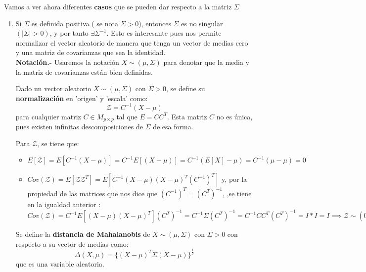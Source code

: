 Vamos a ver ahora diferentes \textbf{casos} que se pueden dar respecto a la matriz $\Sigma$
\begin{enumerate}
\item Si $\Sigma$ es definida positiva ( se nota $\Sigma > 0$), entonces $\Sigma$ es no singular $(|\Sigma| > 0)$, y por tanto $\exists \Sigma^{-1}$. Esto es interesante pues nos permite normalizar el vector aleatorio de manera que tenga un vector de medias cero y una matriz de covarianzas que sea la identidad.\\

  \textbf{Notación.-} Usaremos la notación $X\sim(\mu,\Sigma)$ para denotar que la media y la matriz de covarianzas están bien definidas.\\

  \begin{ndef}[Normalización]
    Dado un vector aleatorio $X\sim(\mu,\Sigma)$ con $\Sigma>0$, se define su \textbf{normalización} en 'origen' y 'escala' como:
    \[
\mathcal Z = C^{-1}(X - \mu)
\]
para cualquier matriz $C\in M_{p\times p}$ tal que $E = CC^T$. Esta matriz $C$ no es única, pues existen infinitas descomposiciones de $\Sigma$ de esa forma.

  \end{ndef}
  Para $\mathcal Z$, se tiene que:
  \begin{itemize}
    \item
  $
  E[\mathcal Z] = E[C^{-1}(X-\mu)] = C^{-1}E[(X-\mu)] = C^{-1}(E[X] - \mu) = C^{-1}(\mu - \mu ) = 0
  $

\item $Cov(\mathcal Z) = E[\mathcal Z \mathcal Z ^T] = E[C^{-1}(X-\mu)(X-\mu)^T(C^{-1})^T]$ y, por la propiedad de las matrices que nos dice que $(C^{-1})^T = (C^T)^{-1}$, ,se tiene en la igualdad anterior : $ Cov(\mathcal Z) = C^{-1}E[(X-\mu)(X-\mu)^T](C^T)^{-1} = C^{-1} \Sigma (C^T)^{-1} = C^{-1}CC^T(C^T)^{-1} = I * I = I \implies \mathcal Z \sim (0, I_{p\times p})$

  \end{itemize}

  \begin{ndef}
    Se define la \textbf{distancia de Mahalanobis} de $X\sim(\mu,\Sigma)$ con $\Sigma > 0$ con respecto a su vector de medias como:
    \[
    \Delta(X,\mu) = \{ (X-\mu)^T \Sigma (X-\mu) \} ^{\frac{1}{2}}
    \]
    que es una variable aleatoria.
  \end{ndef}


\end{enumerate}

